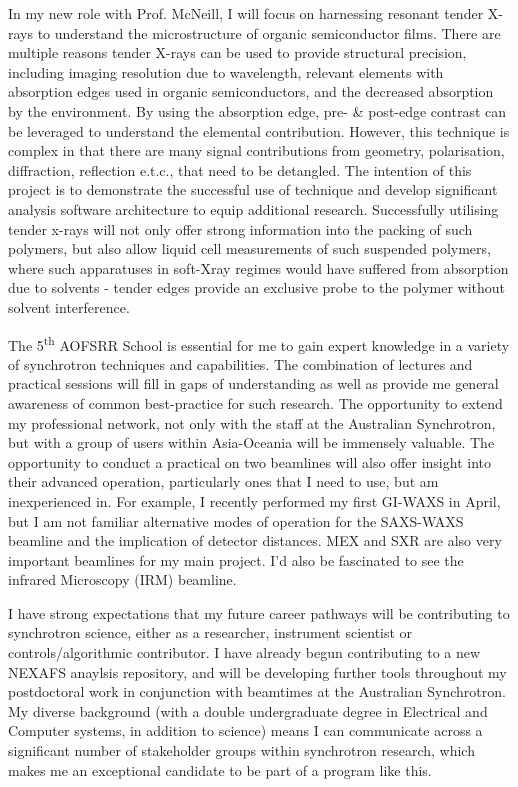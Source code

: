 \documentclass[10pt,a4paper,ragged2e,withhyper,paragraphstrue]{altacv}
\newcommand{\pind}{\hspace{24pt}}
\begin{document}
{    %
    \pind In my new role with Prof. McNeill, I will focus on harnessing resonant tender X-rays to understand the microstructure of organic semiconductor films. There are multiple reasons tender X-rays can be used to provide structural precision, including imaging resolution due to wavelength, relevant elements with absorption edges used in organic semiconductors, and the decreased absorption by the environment. By using the absorption edge, pre- \& post-edge contrast can be leveraged to understand the elemental contribution. However, this technique is complex in that there are many signal contributions from geometry, polarisation, diffraction, reflection e.t.c., that need to be detangled. The intention of this project is to demonstrate the successful use of technique and develop significant analysis software architecture to equip additional research. 
    Successfully utilising tender x-rays will not only offer strong information into the packing of such polymers, but also allow liquid cell measurements of such suspended polymers, where such apparatuses in soft-Xray regimes would have suffered from absorption due to solvents - tender edges provide an exclusive probe to the polymer without solvent interference. 
    
    \pind The 5\textsuperscript{th} AOFSRR School is essential for me to gain expert knowledge in a variety of synchrotron techniques and capabilities. The combination of lectures and practical sessions will fill in gaps of understanding as well as provide me general awareness of common best-practice for such research. The opportunity to extend my professional network, not only with the staff at the Australian Synchrotron, but with a group of users within Asia-Oceania will be immensely valuable. The opportunity to conduct a practical on two beamlines will also offer insight into their advanced operation, particularly ones that I need to use, but am inexperienced in. For example, I recently performed my first GI-WAXS in April, but I am not familiar alternative modes of operation for the SAXS-WAXS beamline and the implication of detector distances. MEX and SXR are also very important beamlines for my main project. I'd also be fascinated to see the infrared Microscopy (IRM) beamline.
    
    \pind I have strong expectations that my future career pathways will be contributing to synchrotron science, either as a researcher, instrument scientist or controls/algorithmic contributor. I have already begun contributing to a new NEXAFS anaylsis repository, and will be developing further tools throughout my postdoctoral work in conjunction with beamtimes at the Australian Synchrotron. My diverse background (with a double undergraduate degree in Electrical and Computer systems, in addition to science) means I can communicate across a significant number of stakeholder groups within synchrotron research, which makes me an exceptional candidate to be part of a program like this.
    
}
\end{document}

